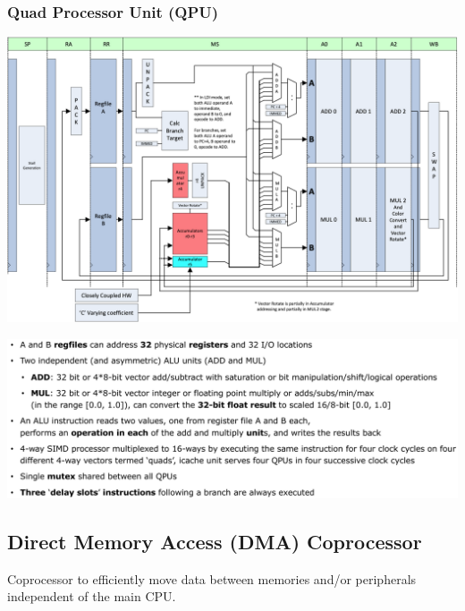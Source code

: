 \documentclass[
  10pt,
  a4paper,
]{article}
\begin{document}
\begin{multicols*}{2}
\subsubsection{Quad Processor Unit (QPU)}\label{quad-processor-unit-qpu}

\includegraphics{images/performance/image-30.png}

\includegraphics{images/performance/image-29.png}

\subsection{Direct Memory Access (DMA)
Coprocessor}\label{direct-memory-access-dma-coprocessor}

Coprocessor to efficiently move data between memories and/or peripherals
independent of the main CPU.


\end{multicols*}
\end{document}
